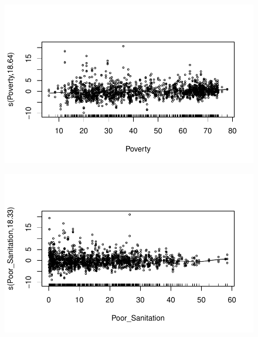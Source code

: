 \documentclass[
  letterpaper,
  DIV=11,
  numbers=noendperiod]{scrartcl}
\begin{document}
\begin{figure}[H]

{\centering \includegraphics{Group34Coursework_files/figure-pdf/unnamed-chunk-10-5.pdf}

}

\end{figure}

\begin{figure}[H]

{\centering \includegraphics{Group34Coursework_files/figure-pdf/unnamed-chunk-10-6.pdf}

}

\end{figure}
\end{document}
